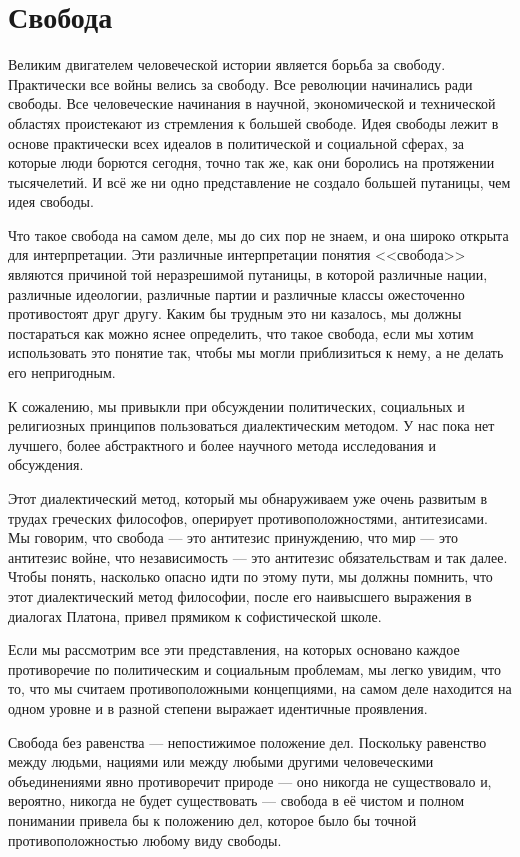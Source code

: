 \chapter{Свобода}

Великим двигателем человеческой истории является борьба за свободу. Практически все войны велись за свободу. Все революции начинались ради свободы. Все человеческие начинания в научной, экономической и технической областях проистекают из стремления к большей свободе. Идея свободы лежит в основе практически всех идеалов в политической и социальной сферах, за которые люди борются сегодня, точно так же, как они боролись на протяжении тысячелетий. И всё же ни одно представление не создало большей путаницы, чем идея свободы.
 
Что такое свобода на самом деле, мы до сих пор не знаем, и она широко открыта для интерпретации. Эти различные интерпретации понятия <<свобода>> являются причиной той неразрешимой путаницы, в которой различные нации, различные идеологии, различные партии и различные классы ожесточенно противостоят друг другу. Каким бы трудным это ни казалось, мы должны постараться как можно яснее определить, что такое свобода, если мы хотим использовать это понятие так, чтобы мы могли приблизиться к нему, а не делать его непригодным.
 
К сожалению, мы привыкли при обсуждении политических, социальных и религиозных принципов пользоваться диалектическим методом. У нас пока нет лучшего, более абстрактного и более научного метода исследования и обсуждения.
 
Этот диалектический метод, который мы обнаруживаем уже очень развитым в трудах греческих философов, оперирует противоположностями, антитезисами. Мы говорим, что свобода — это антитезис принуждению, что мир — это антитезис войне, что независимость — это антитезис обязательствам и так далее. Чтобы понять, насколько опасно идти по этому пути, мы должны помнить, что этот диалектический метод философии, после его наивысшего выражения в диалогах Платона, привел прямиком к софистической школе.

Если мы рассмотрим все эти представления, на которых основано каждое противоречие по политическим и социальным проблемам, мы легко увидим, что то, что мы считаем противоположными концепциями, на самом деле находится на одном уровне и в разной степени выражает идентичные проявления.
 
Свобода без равенства — непостижимое положение дел. Поскольку равенство между людьми, нациями или между любыми другими человеческими объединениями явно противоречит природе — оно никогда не существовало и, вероятно, никогда не будет существовать — свобода в её чистом и полном понимании привела бы к положению дел, которое было бы точной противоположностью любому виду свободы.
 
